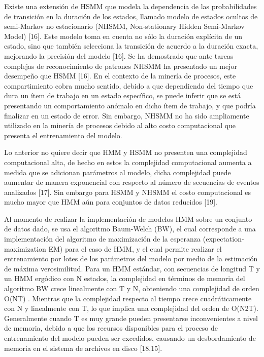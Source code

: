 Existe una extensión de HSMM que modela la dependencia de las probabilidades de transición en la duración de los estados, llamado modelo de estados ocultos de semi-Markov no estacionario (NHSMM, Non-stationary Hidden Semi-Markov Model) [16]. Este modelo toma en cuenta no sólo la duración explícita de un estado, sino que también selecciona la transición de acuerdo a la duración exacta, mejorando la precisión del modelo [16]. Se ha demostrado que ante tareas complejas de reconocimiento de patrones NHSMM ha presentado un mejor desempeño que HSMM [16]. En el contexto de la minería de procesos, este compartimiento cobra mucho sentido, debido a que dependiendo del tiempo que dura un ítem de trabajo en un estado específico, se puede inferir que se está presentando un comportamiento anómalo en dicho ítem de trabajo, y que podría finalizar en un estado de error. Sin embargo, NHSMM no ha sido ampliamente utilizado en la minería de procesos debido al alto costo computacional que presenta el entrenamiento del modelo.

Lo anterior no quiere decir que HMM y HSMM no presenten una complejidad computacional alta, de hecho en estos la complejidad computacional aumenta a medida que se adicionan parámetros al modelo, dicha complejidad puede aumentar de manera exponencial con respecto al número de secuencias de eventos analizados [17]. Sin embargo para HSMM y NHSMM el costo computacional es mucho mayor que HMM aún para conjuntos de datos reducidos [19].

Al momento de realizar la implementación de modelos HMM sobre un conjunto de datos dado, se usa el algoritmo Baum-Welch (BW), el cual corresponde a una implementación del algoritmo de maximización de la esperanza (expectation-maximization EM) para el caso de HMM, y el cual permite realizar el entrenamiento por lotes de los parámetros del modelo por medio de la estimación de máxima verosimilitud. Para un HMM estándar, con secuencias de longitud T y un HMM ergódico con N estados, la complejidad en términos de memoria del algoritmo BW crece linealmente con T y N, obteniendo una complejidad de orden O(NT) . Mientras que la complejidad respecto al tiempo crece cuadráticamente con N y linealmente con T, lo que implica una complejidad del orden de O(N2T). Generalmente cuando T es muy grande pueden presentarse inconvenientes a nivel de memoria, debido a que los recursos disponibles para el proceso de entrenamiento del modelo pueden ser excedidos, causando un desbordamiento de memoria en el sistema de archivos en disco [18,15].

